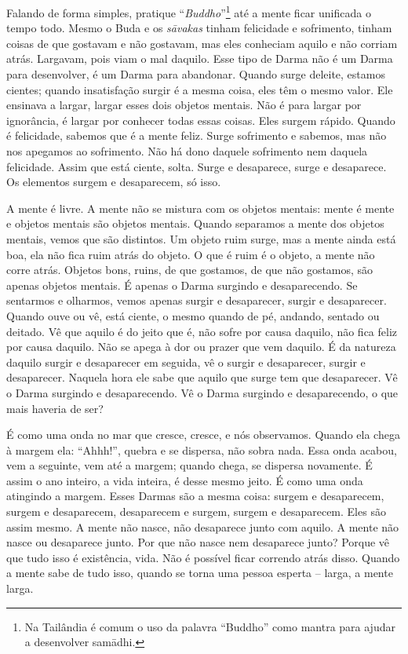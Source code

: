 Falando de forma simples, pratique “\textit{Buddho}”\footnote{Na
Tailândia é comum o uso da palavra “Buddho” como mantra para ajudar a
desenvolver sam\=adhi.} até a mente ficar unificada o tempo todo. Mesmo
o Buda e os \textit{s\=avakas} tinham felicidade e sofrimento, tinham
coisas de que gostavam e não gostavam, mas eles conheciam aquilo e não
corriam atrás. Largavam, pois viam o mal daquilo. Esse tipo de Darma
não é um Darma para desenvolver, é um Darma para abandonar. Quando
surge deleite, estamos cientes; quando insatisfação surgir é a mesma
coisa, eles têm o mesmo valor. Ele ensinava a largar, largar esses dois
objetos mentais. Não é para largar por ignorância, é largar por
conhecer todas essas coisas. Eles surgem rápido. Quando é felicidade,
sabemos que é a mente feliz. Surge sofrimento e sabemos, mas não nos
apegamos ao sofrimento. Não há dono daquele sofrimento nem daquela
felicidade. Assim que está ciente, solta. Surge e desaparece, surge e
desaparece. Os elementos surgem e desaparecem, só isso. 

A mente é livre. A mente não se mistura com os objetos mentais:
mente é mente e objetos mentais são objetos mentais. Quando separamos a
mente dos objetos mentais, vemos que são distintos. Um objeto ruim
surge, mas a mente ainda está boa, ela não fica ruim atrás do objeto. O
que é ruim é o objeto, a mente não corre atrás. Objetos bons, ruins, de
que gostamos, de que não gostamos, são apenas objetos mentais. É apenas
o Darma surgindo e desaparecendo. Se sentarmos e olharmos, vemos apenas
surgir e desaparecer, surgir e desaparecer. Quando ouve ou vê, está
ciente, o mesmo quando de pé, andando, sentado ou deitado. Vê que
aquilo é do jeito que é, não sofre por causa daquilo, não fica feliz
por causa daquilo. Não se apega à dor ou prazer que vem daquilo. É da
natureza daquilo surgir e desaparecer em seguida, vê o surgir e
desaparecer, surgir e desaparecer. Naquela hora ele sabe que aquilo que
surge tem que desaparecer. Vê o Darma surgindo e desaparecendo. Vê o
Darma surgindo e desaparecendo, o que mais haveria de ser? 

É como uma onda no mar que cresce, cresce, e nós observamos. Quando
ela chega à margem ela: “Ahhh!”, quebra e se dispersa, não sobra nada.
Essa onda acabou, vem a seguinte, vem até a margem; quando chega, se
dispersa novamente. É assim o ano inteiro, a vida inteira, é desse
mesmo jeito. É como uma onda atingindo a margem. Esses Darmas são a
mesma coisa: surgem e desaparecem, surgem e desaparecem, desaparecem e
surgem, surgem e desaparecem. Eles são assim mesmo. A mente não nasce,
não desaparece junto com aquilo. A mente não nasce ou desaparece junto.
Por que não nasce nem desaparece junto? Porque vê que tudo isso é
existência, vida. Não é possível ficar correndo atrás disso. Quando a
mente sabe de tudo isso, quando se torna uma pessoa esperta – larga, a
mente larga. 

